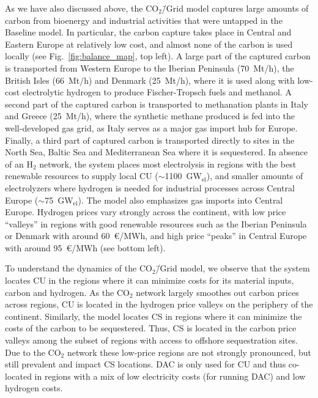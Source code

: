 \documentclass[twocolumn]{article}
\newcommand{\COtwo}{CO$_2$}
\newcommand{\Htwo}{H$_2$}
\newcommand{\modBase}{Baseline model}
\newcommand{\modCO}{CO$_2$\=/Grid model}
\begin{document}
As we have also discussed above, the \modCO{} captures large amounts of carbon from bioenergy and industrial activities that were untapped in the \modBase{}. In particular, the carbon capture takes place in Central and Eastern Europe at relatively low cost, and almost none of the carbon is used locally (see Fig.~\ref{fig:balance_map}, top left). A large part of the captured carbon is transported from Western Europe to the Iberian Peninsula (70~Mt/h), the British Isles (66~Mt/h) and Denmark (25~Mt/h), where it is used along with low-cost electrolytic hydrogen to produce Fischer-Tropsch fuels and methanol. A second part of the captured carbon is transported to methanation plants in Italy and Greece (25~Mt/h), where the synthetic methane produced is fed into the well-developed gas grid, as Italy serves as a major gas import hub for Europe. Finally, a third part of captured carbon is transported directly to sites in the North Sea, Baltic Sea and Mediterranean Sea where it is sequestered. In absence of an \Htwo{} network, the system places most electrolysis in regions with the best renewable resources to supply local CU ($\sim$1100~GW$_\text{el}$), and smaller amounts of electrolyzers where hydrogen is needed for industrial processes across Central Europe ($\sim$75~GW$_\text{el}$). The model also emphasizes gas imports into Central Europe. Hydrogen prices vary strongly across the continent, with low price ``valleys'' in regions with good renewable resources such as the Iberian Peninsula or Denmark with around 60~€/MWh, and high price ``peaks'' in Central Europe with around 95~€/MWh (see bottom left).

To understand the dynamics of the \modCO{}, we observe that the system locates CU in the regions where it can minimize costs for its material inputs, carbon and hydrogen. As the \COtwo{} network largely smoothes out carbon prices across regions, CU is located in the hydrogen price valleys on the periphery of the continent. Similarly, the model locates CS in regions where it can minimize the costs of the carbon to be sequestered. Thus, CS is located in the carbon price valleys among the subset of regions with access to offshore sequestration sites. Due to the \COtwo{} network these low-price regions are not strongly pronounced, but still prevalent and impact CS locations. DAC is only used for CU and thus co-located in regions with a mix of low electricity costs (for running DAC) and low hydrogen costs.
\end{document}
